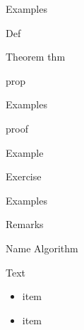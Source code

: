 \begin{frame}{Examples}
\begin{Def}
Def
\end{Def}
\begin{thm}{Theorem}
thm
\end{thm}
\begin{prop}
prop
\end{prop}
\end{frame}
\begin{frame}{Examples}
\begin{Pf}
proof
\end{Pf}
\begin{Ex}
Example
\end{Ex}
\begin{Exo}
Exercise
\end{Exo}
\end{frame}
\begin{frame}{Examples}
\begin{remarks}
\item Remarks
\end{remarks}
\begin{algo}{Name}
Algorithm
\end{algo}
\begin{textbox}
Text
\begin{itemize}
    \item item
    \item item
\end{itemize}
\end{textbox}
\end{frame}
